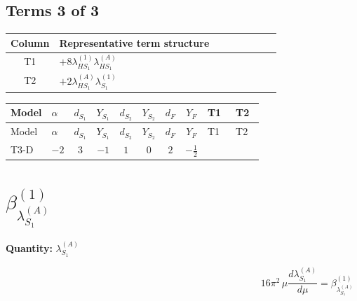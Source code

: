\documentclass[8pt]{article}
\begin{document}
\begin{landscape}
\subsection*{Terms 3 of 3}
\begin{center}
\begin{tabular}{@{}c >{\raggedright\arraybackslash}p{0.82\linewidth}@{}}
\toprule
Column & Representative term structure \\
\midrule
T1 & \(\displaystyle +8 {\lambda_{HS_1}^{(1)}} {\lambda_{HS_1}^{(A)}}\) \\
\midrule
T2 & \(\displaystyle +2 {\lambda_{HS_1}^{(A)}} {\lambda_{S_1}^{(1)}}\) \\
\midrule
\bottomrule
\end{tabular}
\end{center}
\smallskip
\tiny
\begin{longtable}{@{}llcccccc >{\raggedright\arraybackslash}p{0.21\linewidth} >{\raggedright\arraybackslash}p{0.21\linewidth}@{}}
\toprule
Model & $\alpha$ & $d_{S_1}$ & $Y_{S_1}$ & $d_{S_2}$ & $Y_{S_2}$ & $d_F$ & $Y_F$ & T1 & T2 \\
\midrule
\endfirsthead
\toprule
Model & $\alpha$ & $d_{S_1}$ & $Y_{S_1}$ & $d_{S_2}$ & $Y_{S_2}$ & $d_F$ & $Y_F$ & T1 & T2 \\
\midrule
\endhead
T3-D & $-2$ & $3$ & $-1$ & $1$ & $0$ & $2$ & $-\frac{1}{2}$ & \scriptsize\adjustbox{max width=\linewidth}{$\begin{gathered} +8 {\lambda_{HS_1}^{(1)}} {\lambda_{HS_1}^{(A)}}\end{gathered}$} & \scriptsize\adjustbox{max width=\linewidth}{$\begin{gathered} +2 {\lambda_{HS_1}^{(A)}} {\lambda_{S_1}^{(1)}}\end{gathered}$} \\
\midrule
\bottomrule
\end{longtable}
\clearpage
\section*{$\beta_{\lambda_{S_1}^{(A)}}^{(1)}$}
\noindent\textbf{Quantity: }$\lambda_{S_1}^{(A)}$\par\smallskip
\[16\pi^2\,\mu\frac{d \lambda_{S_1}^{(A)}}{d\mu}=\beta_{\lambda_{S_1}^{(A)}}^{(1)}\]

\end{landscape}
\end{document}
